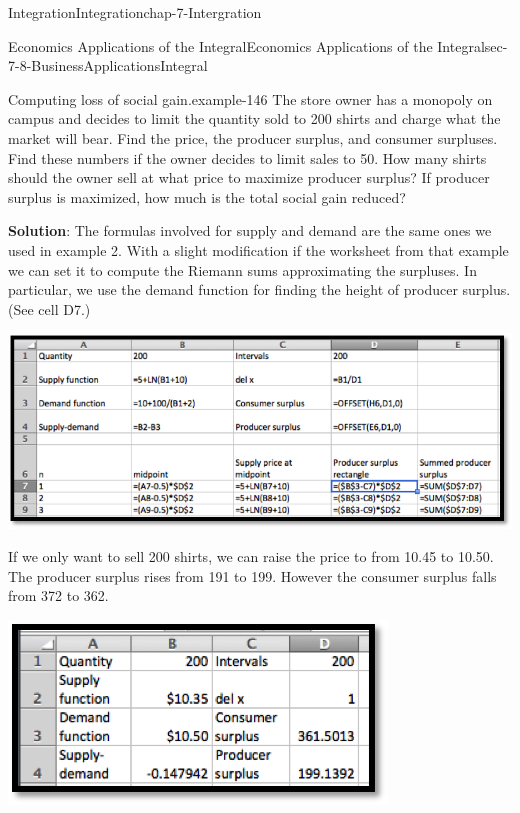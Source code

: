 \documentclass[oneside,10pt,]{book}
\newcommand{\terminology}[1]{\textbf{#1}}
\numberwithin{equation}{section}
\begin{document}
\begin{chapterptx}{Integration}{}{Integration}{}{}{chap-7-Intergration}
\begin{sectionptx}{Economics Applications of the Integral}{}{Economics Applications of the Integral}{}{}{sec-7-8-BusinessApplicationsIntegral}
\begin{example}{Computing loss of social gain.}{example-146}
The store owner has a monopoly on campus and decides to limit the quantity sold to 200 shirts and charge what the market will bear.  Find the price, the producer surplus, and consumer surpluses.  Find these numbers if the owner decides to limit sales to 50.   How many shirts should the owner sell at what price to maximize producer surplus?  If producer surplus is maximized, how much is the total social gain reduced?%
\par
\hypertarget{p-3103}{}%
\terminology{Solution}: The formulas involved for supply and demand are the same ones we used in example 2.  With a slight modification if the worksheet from that example we can set it to compute the Riemann sums approximating the surpluses.  In particular, we use the demand function for finding the height of producer surplus.  (See cell D7.)%
\begin{sidebyside}{1}{0.1}{0.1}{0}%
\begin{sbspanel}{0.8}%
\includegraphics[width=1\linewidth]{images/sec7-8-10.png}
\end{sbspanel}%
\end{sidebyside}%
\par
\hypertarget{p-3104}{}%
If we only want to sell 200 shirts, we can raise the price to from \textdollar{}10.45 to \textdollar{}10.50.  The producer surplus rises from \textdollar{}191 to \textdollar{}199.  However the consumer surplus falls from \textdollar{}372 to \textdollar{}362.%
\begin{sidebyside}{1}{0.25}{0.25}{0}%
\begin{sbspanel}{0.5}%
\includegraphics[width=1\linewidth]{images/sec7-8-11.png}

\end{sbspanel}
\end{sidebyside}
\end{example}
\end{sectionptx}
\end{chapterptx}
\end{document}
